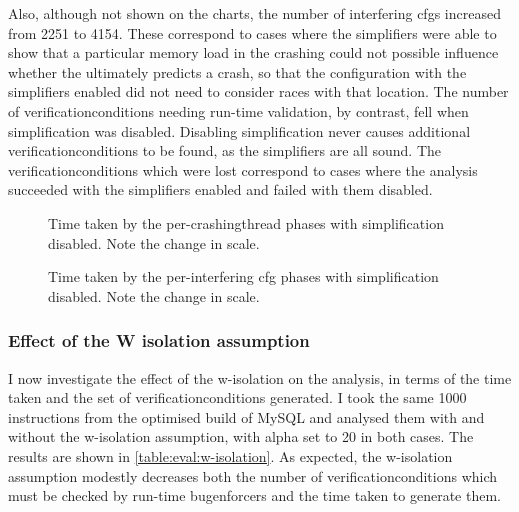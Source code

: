 Also, although not shown on the charts, the number of interfering
\glspl{cfg} increased from 2251 to 4154.  These correspond to cases
where the simplifiers were able to show that a particular memory load
in the crashing {\StateMachine} could not possible influence whether
the {\StateMachine} ultimately predicts a crash, so that the
configuration with the simplifiers enabled did not need to consider
races with that location.  The number of \glspl{verificationcondition}
needing run-time validation, by contrast, fell when simplification was
disabled.  Disabling simplification never causes additional
\glspl{verificationcondition} to be found, as the simplifiers are all
sound.  The \glspl{verificationcondition} which were lost correspond
to cases where the analysis succeeded with the simplifiers enabled and
failed with them disabled.

\begin{figure}
  \caption{Time taken by the per-\gls{crashingthread} phases with
    {\StateMachine} simplification disabled.  Note the change in
    scale.}
  \label{fig:eval:time_breakdown:crashing_no_simple}
\end{figure}

\begin{figure}
  \caption{Time taken by the per-interfering \gls{cfg} phases with
    {\StateMachine} simplification disabled.  Note the change in
    scale.}
  \label{fig:eval:time_breakdown:interfering_no_simple}
\end{figure}

\subsubsection{Effect of the W isolation assumption}
\label{sect:eval:w_isolation}


I now investigate the effect of the \gls{w-isolation} on the analysis,
in terms of the time taken and the set of
\glspl{verificationcondition} generated.  I took the same 1000
instructions from the optimised build of MySQL and analysed them with
and without the \gls{w-isolation} assumption, with \gls{alpha} set to
20 in both cases.  The results are shown in
\autoref{table:eval:w-isolation}.  As expected, the \gls{w-isolation}
assumption modestly decreases both the number of
\glspl{verificationcondition} which must be checked by run-time
\glspl{bugenforcer} and the time taken to generate them.

